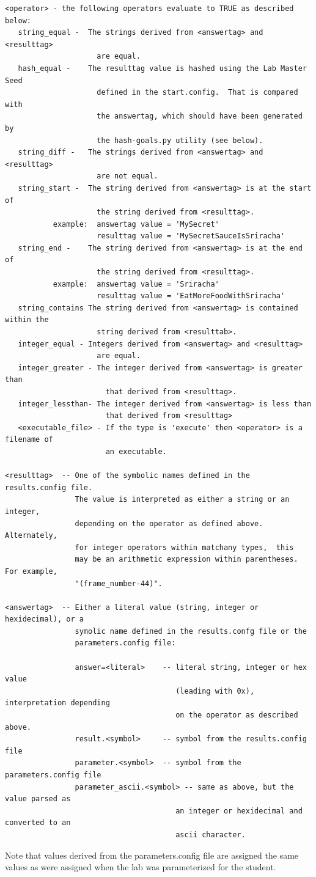 \documentclass[12pt]{article}
\begin{document}
\begin{verbatim}
<operator> - the following operators evaluate to TRUE as described below:
   string_equal -  The strings derived from <answertag> and <resulttag>
                     are equal.
   hash_equal -    The resulttag value is hashed using the Lab Master Seed
                     defined in the start.config.  That is compared with
                     the answertag, which should have been generated by
                     the hash-goals.py utility (see below).
   string_diff -   The strings derived from <answertag> and <resulttag>
                     are not equal.
   string_start -  The string derived from <answertag> is at the start of 
                     the string derived from <resulttag>.
           example:  answertag value = 'MySecret'
                     resulttag value = 'MySecretSauceIsSriracha'
   string_end -    The string derived from <answertag> is at the end of
                     the string derived from <resulttag>.
           example:  answertag value = 'Sriracha'
                     resulttag value = 'EatMoreFoodWithSriracha'
   string_contains The string derived from <answertag> is contained within the
                     string derived from <resulttab>.
   integer_equal - Integers derived from <answertag> and <resulttag>
                     are equal.
   integer_greater - The integer derived from <answertag> is greater than
                       that derived from <resulttag>.
   integer_lessthan- The integer derived from <answertag> is less than
                       that derived from <resulttag>
   <executable_file> - If the type is 'execute' then <operator> is a filename of 
                       an executable.
             
<resulttag>  -- One of the symbolic names defined in the results.config file.
                The value is interpreted as either a string or an integer,
                depending on the operator as defined above.  Alternately, 
                for integer operators within matchany types,  this
                may be an arithmetic expression within parentheses.  For example,
                "(frame_number-44)".
                
<answertag>  -- Either a literal value (string, integer or hexidecimal), or a 
                symolic name defined in the results.confg file or the 
                parameters.config file:
 
                answer=<literal>    -- literal string, integer or hex value 
                                       (leading with 0x), interpretation depending 
                                       on the operator as described above.
                result.<symbol>     -- symbol from the results.config file
                parameter.<symbol>  -- symbol from the parameters.config file
                parameter_ascii.<symbol> -- same as above, but the value parsed as 
                                       an integer or hexidecimal and converted to an 
                                       ascii character.

\end{verbatim}
         Note that values derived from the parameters.config file are assigned the same values as
         were assigned when the lab was parameterized for the student.
\end{document}
